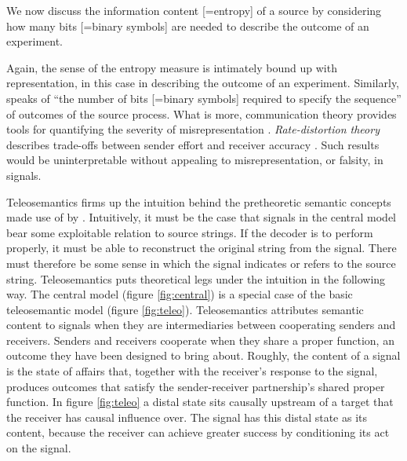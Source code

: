 \begin{myquote}
We now discuss the information content [=entropy] of a source by considering how many bits [=binary symbols] are needed to describe the outcome of an experiment.
\par\hspace*{\fill}\citet[73]{mackay2003information}
\end{myquote}

\noindent Again, the sense of the entropy measure is intimately bound up with representation, in this case in describing the outcome of an experiment.
Similarly, \citet[397]{shannon1948mathematicala} speaks of ``the number of bits [=binary symbols] required to specify the sequence'' of outcomes of the source process.
What is more, communication theory provides tools for quantifying the severity of misrepresentation \citep{martinez2020information}.
\textit{Rate-distortion theory} describes trade-offs between sender effort and receiver accuracy \citep{shannon1959coding}.
Such results would be uninterpretable without appealing to misrepresentation, or falsity, in signals.

Teleosemantics firms up the intuition behind the pretheoretic semantic concepts made use of by \citet{cover2006elements,mackay2003information,shannon1948mathematicala,shannon1959coding}.
Intuitively, it must be the case that signals in the central model bear some exploitable relation to source strings.
If the decoder is to perform properly, it must be able to reconstruct the original string from the signal.
There must therefore be some sense in which the signal indicates or refers to the source string.
Teleosemantics puts theoretical legs under the intuition in the following way.
The central model (figure \ref{fig:central}) is a special case of the basic teleosemantic model (figure \ref{fig:teleo}).
Teleosemantics attributes semantic content to signals when they are intermediaries between cooperating senders and receivers.
Senders and receivers cooperate when they share a proper function, an outcome they have been designed to bring about.
Roughly, the content of a signal is the state of affairs that, together with the receiver's response to the signal, produces outcomes that satisfy the sender-receiver partnership's shared proper function.
In figure \ref{fig:teleo} a distal state sits causally upstream of a target that the receiver has causal influence over.
The signal has this distal state as its content, because the receiver can achieve greater success by conditioning its act on the signal.

